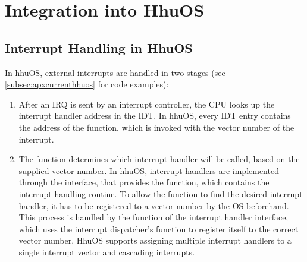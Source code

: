 %
%

\section{Integration into HhuOS}
\label{sec:apxhhuos}

\subsection{Interrupt Handling in HhuOS}
\label{subsec:apxcurrenthhuos}

In hhuOS, external interrupts are handled in two stages (see \autoref{subsec:apxcurrenthhuos} for code examples):

\begin{enumerate}
  \item After an IRQ is sent by an interrupt controller, the CPU looks up the interrupt handler address in the IDT\@.
        In hhuOS, every IDT entry contains the address of the  function, which is invoked with the vector number of the interrupt.
  \item The  function determines which interrupt handler will be called, based on the supplied vector number.
        In hhuOS, interrupt handlers are implemented through the  interface, that provides the  function, which contains the interrupt handling routine.
        To allow the  function to find the desired interrupt handler, it has to be registered to a vector number by the OS beforehand.
        This process is handled by the  function of the interrupt handler interface, which uses the interrupt dispatcher's  function to register itself to the correct vector number.
        HhuOS supports assigning multiple interrupt handlers to a single interrupt vector and cascading interrupts.
\end{enumerate}

